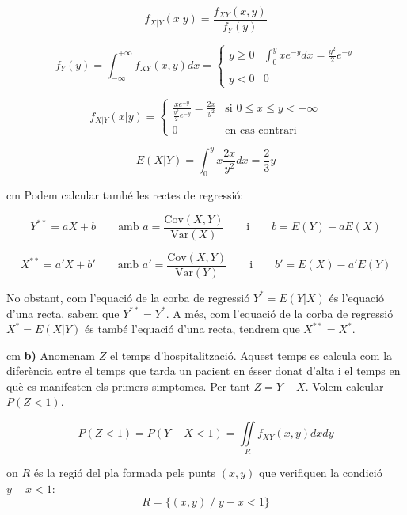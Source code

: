 \documentclass{article}
\begin{document}
\[
f_{X|Y}(x|y)= \frac{ f_{XY}(x, y) }{f_Y(y)}
\]

\[
f_Y(y)= \int_{-\infty}^{+\infty} f_{XY}(x, y) dx = 
\begin{cases} y \geq 0 & \int_0^y x e^{-y} dx = \frac{y^2}{2} e^{-y} \\ \\
y < 0 & 0 \end{cases}
\]

\[
f_{X|Y}(x|y)= \begin{cases} \frac{ x e^{-y} } { \frac{y^2}{2} e^{-y} } = \frac{2x}{y^2} 
& \text{si   } 0 \leq x \leq y < +\infty \\
0 & \text{en cas contrari}\end{cases}
\]

\[
E(X|Y)= \int_{0}^{y} x \frac{2x}{y^2} dx = \frac{2}{3} y
\]


 cm
Podem calcular tamb\'e les rectes de regressi\'o:

\[
Y^{**}=aX+b \qquad \text{amb } a=\frac{\mathrm{Cov}(X, Y)}{\mathrm{Var}(X)} \qquad \text{i} \qquad b=E(Y)-a E(X) 
\]

\[
X^{**}=a'X+b' \qquad \text{amb } a'=\frac{\mathrm{Cov}(X, Y)}{\mathrm{Var}(Y)} \qquad \text{i} \qquad b'=E(X)-a' E(Y) 
\]

No obstant, com l'equaci\'o de la corba de regressi\'o $Y^*=E(Y|X)$ \'es l'equaci\'o d'una recta, sabem que 
$Y^{**}=Y^*$. A m\'es, com l'equaci\'o de la corba de regressi\'o $X^*=E(X|Y)$ \'es tamb\'e l'equaci\'o d'una recta,
tendrem que $X^{**}=X^*$.

 cm
\noindent
\textbf{b)} Anomenam $Z$ el temps d'hospitalitzaci\'o. Aquest temps es calcula com la difer\`encia entre el temps que
 tarda un pacient en \'esser donat d'alta i el temps en qu\`e es manifesten els primers simptomes. Per tant
 $Z=Y-X$. Volem calcular $P(Z < 1)$.
 
 \[
 P(Z < 1) = P(Y-X < 1) = \iint\limits_R f_{XY}(x, y) dxdy
 \]
 
on $R$ \'es la regi\'o del pla formada pels punts $(x, y)$ que verifiquen la condici\'o $y-x < 1$:
\[
R=\{ (x, y) \; / \; y-x < 1 \}
\]
\end{document}
